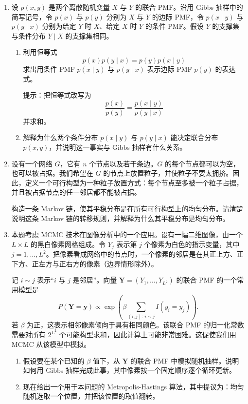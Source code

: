 \documentclass[UTF8, 12pt, fontset=fandol, oneside]{ctexart}
\begin{document}
\begin{enumerate}
  \item 设 $p(x,y)$ 是两个离散随机变量 $X$ 与 $Y$ 的联合 PMF。沿用 Gibbs 抽样中的简写记号，令 $p(x)$ 与 $p(y)$ 分别为 $X$ 与 $Y$ 的边际 PMF，令 $p(x\mid y)$ 与 $p(y\mid x)$ 分别为给定 $Y$ 时 $X$、给定 $X$ 时 $Y$ 的条件 PMF。假设 $Y$ 的支撑集与条件分布 $Y\mid X$ 的支撑集相同。

  \begin{enumerate}
    \item[(a)] 利用恒等式
    \[
      p(x)p(y\mid x)=p(y)p(x\mid y)
    \]
    求出用条件 PMF $p(x\mid y)$ 与 $p(y\mid x)$ 表示边际 PMF $p(y)$ 的表达式。

    提示：把恒等式改写为
    \[
      \frac{p(x)}{p(y)}=\frac{p(x\mid y)}{p(y\mid x)}
    \]
    并求和。

    \item[(b)] 解释为什么两个条件分布 $p(x\mid y)$ 与 $p(y\mid x)$ 能决定联合分布 $p(x,y)$，并说明这一事实与 Gibbs 抽样有什么关系。
  \end{enumerate}

  \item 设有一个网络 $G$，它有 $n$ 个节点以及若干条边。$G$ 的每个节点都可以为空，也可以被占据。我们希望在 $G$ 的节点上放置粒子，并使粒子不要太拥挤。因此，定义一个可行构型为一种粒子放置方式：每个节点至多被一个粒子占据，并且被占据节点的任一邻居都不能被占据。

  构造一条 Markov 链，使其平稳分布是在所有可行构型上的均匀分布。请清楚说明这条 Markov 链的转移规则，并解释为什么其平稳分布是均匀分布。

  \item 本题考虑 MCMC 技术在图像分析中的一个应用。设有一幅二维图像，由一个 $L\times L$ 的黑白像素网格组成。令 $Y_j$ 表示第 $j$ 个像素为白色的指示变量，其中 $j=1,\ldots,L^2$。把像素看成网络中的节点时，一个像素的邻居是在其正上方、正下方、正左方与正右方的像素（边界情形除外）。

  记 $i\sim j$ 表示“$i$ 与 $j$ 是邻居”。向量 $\mathbf Y=(Y_1,\ldots,Y_{L^2})$ 的联合 PMF 的一个常用模型是
  \[
    P(\mathbf Y=\mathbf y)\propto
    \exp\left(
      \beta\sum_{(i,j):\,i\sim j} I(y_i=y_j)
    \right).
  \]
  若 $\beta$ 为正，这表示相邻像素倾向于具有相同颜色。该联合 PMF 的归一化常数需要对所有 $2^{L^2}$ 个可能构型求和，因此计算上可能非常困难。这促使我们用 MCMC 从该模型中模拟。

  \begin{enumerate}
    \item[(a)] 假设要在某个已知的 $\beta$ 值下，从 $\mathbf Y$ 的联合 PMF 中模拟随机抽样。说明如何用 Gibbs 抽样完成此事，其中像素按一个固定顺序逐个循环更新。

    \item[(b)] 现在给出一个用于本问题的 Metropolis-Hastings 算法，其中提议为：均匀随机选取一个位置，并把该位置的取值翻转。
  \end{enumerate}
\end{enumerate}
\end{document}
